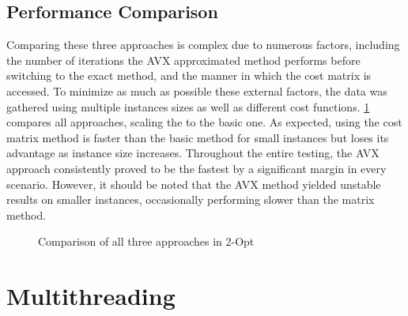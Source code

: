 \subsection{Performance Comparison}

Comparing these three approaches is complex due to numerous factors, including the number of iterations the AVX approximated method performs before switching to the exact method, and the manner in which the cost matrix is accessed.
To minimize as much as possible these external factors, the data was gathered using multiple instances sizes as well as different cost functions.
\figurename{ \ref{fig:avxShowcase}} compares all approaches, scaling the to the basic one.
As expected, using the cost matrix method is faster than the basic method for small instances but loses its advantage as instance size increases.
Throughout the entire testing, the AVX approach consistently proved to be the fastest by a significant margin in every scenario.
However, it should be noted that the AVX method yielded unstable results on smaller instances, occasionally performing slower than the matrix method.

\begin{figure}[htbp]
    \centering
    \caption{Comparison of all three approaches in 2-Opt} \label{fig:avxShowcase}
\end{figure}


\section{Multithreading}

